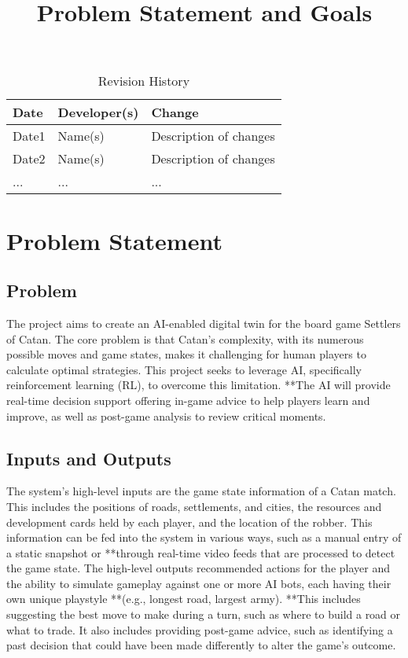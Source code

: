 \documentclass{article}
\title{Problem Statement and Goals\\\progname}
\author{\authname}
\date{}
\begin{document}
\maketitle

\begin{table}[hp]
\caption{Revision History} \label{TblRevisionHistory}
\begin{tabularx}{\textwidth}{llX}
\toprule
\textbf{Date} & \textbf{Developer(s)} & \textbf{Change}\\
\midrule
Date1 & Name(s) & Description of changes\\
Date2 & Name(s) & Description of changes\\
... & ... & ...\\
\bottomrule
\end{tabularx}
\end{table}

\section{Problem Statement}



\subsection{Problem}
The project aims to create an AI-enabled digital twin for the board game Settlers of Catan. The core problem is that Catan's complexity, with its numerous possible moves and game states, makes it challenging for human players to calculate optimal strategies. This project seeks to leverage AI, specifically reinforcement learning (RL), to overcome this limitation. **The AI will provide real-time decision support offering in-game advice to help players learn and improve, as well as post-game analysis to review critical moments.

\subsection{Inputs and Outputs}
The system's high-level inputs are the game state information of a Catan match. This includes the positions of roads, settlements, and cities, the resources and development cards held by each player, and the location of the robber. This information can be fed into the system in various ways, such as a manual entry of a static snapshot or **through real-time video feeds that are processed to detect the game state. The high-level outputs recommended actions for the player and the ability to simulate gameplay against one or more AI bots, each having their own unique playstyle **(e.g., longest road, largest army). **This includes suggesting the best move to make during a turn, such as where to build a road or what to trade. It also includes providing post-game advice, such as identifying a past decision that could have been made differently to alter the game's outcome.
\end{document}
